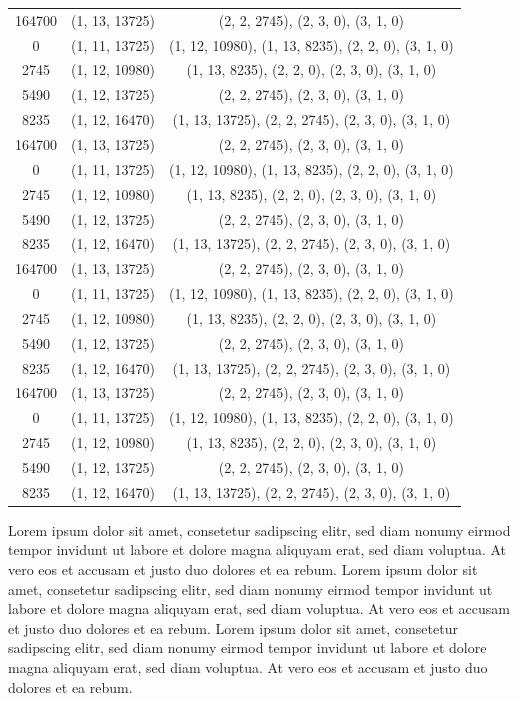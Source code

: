 \begin{small}
\begin{longtable}{ccc}
		164700 & (1, 13, 13725) & (2, 2, 2745), (2, 3, 0), (3, 1, 0) \\
		0      & (1, 11, 13725) & (1, 12, 10980), (1, 13, 8235), (2, 2, 0), (3, 1, 0) \\
		2745   & (1, 12, 10980) & (1, 13, 8235), (2, 2, 0), (2, 3, 0), (3, 1, 0) \\
		5490   & (1, 12, 13725) & (2, 2, 2745), (2, 3, 0), (3, 1, 0) \\
		8235   & (1, 12, 16470) & (1, 13, 13725), (2, 2, 2745), (2, 3, 0), (3, 1, 0) \\
		164700 & (1, 13, 13725) & (2, 2, 2745), (2, 3, 0), (3, 1, 0) \\
		0      & (1, 11, 13725) & (1, 12, 10980), (1, 13, 8235), (2, 2, 0), (3, 1, 0) \\
		2745   & (1, 12, 10980) & (1, 13, 8235), (2, 2, 0), (2, 3, 0), (3, 1, 0) \\
		5490   & (1, 12, 13725) & (2, 2, 2745), (2, 3, 0), (3, 1, 0) \\
		8235   & (1, 12, 16470) & (1, 13, 13725), (2, 2, 2745), (2, 3, 0), (3, 1, 0) \\
		164700 & (1, 13, 13725) & (2, 2, 2745), (2, 3, 0), (3, 1, 0) \\
		0      & (1, 11, 13725) & (1, 12, 10980), (1, 13, 8235), (2, 2, 0), (3, 1, 0) \\
		2745   & (1, 12, 10980) & (1, 13, 8235), (2, 2, 0), (2, 3, 0), (3, 1, 0) \\
		5490   & (1, 12, 13725) & (2, 2, 2745), (2, 3, 0), (3, 1, 0) \\
		8235   & (1, 12, 16470) & (1, 13, 13725), (2, 2, 2745), (2, 3, 0), (3, 1, 0) \\
		164700 & (1, 13, 13725) & (2, 2, 2745), (2, 3, 0), (3, 1, 0) \\
		0      & (1, 11, 13725) & (1, 12, 10980), (1, 13, 8235), (2, 2, 0), (3, 1, 0) \\
		2745   & (1, 12, 10980) & (1, 13, 8235), (2, 2, 0), (2, 3, 0), (3, 1, 0) \\
		5490   & (1, 12, 13725) & (2, 2, 2745), (2, 3, 0), (3, 1, 0) \\
		8235   & (1, 12, 16470) & (1, 13, 13725), (2, 2, 2745), (2, 3, 0), (3, 1, 0) \\
\end{longtable}
\end{small}
\vspace{-9pt} %

Lorem ipsum dolor sit amet, consetetur sadipscing elitr, sed diam nonumy eirmod tempor invidunt ut labore et dolore magna aliquyam erat, sed diam voluptua. At vero eos et accusam et justo duo dolores et ea rebum. Lorem ipsum dolor sit amet, consetetur sadipscing elitr, sed diam nonumy eirmod tempor invidunt ut labore et dolore magna aliquyam erat, sed diam voluptua. At vero eos et accusam et justo duo dolores et ea rebum. Lorem ipsum dolor sit amet, consetetur sadipscing elitr, sed diam nonumy eirmod tempor invidunt ut labore et dolore magna aliquyam erat, sed diam voluptua. At vero eos et accusam et justo duo dolores et ea rebum. 